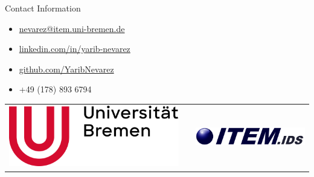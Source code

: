 \documentclass[final]{beamer}
\newlength{\onecolwid}
\begin{document}
\begin{frame}[t]
\begin{columns}[t]
\begin{column}{\onecolwid}
\begin{alertblock}{Contact Information}
\begin{itemize}
\item \href{mailto:nevarez@item.uni-bremen.de}{nevarez@item.uni-bremen.de}
\item \href{www.linkedin.com/in/yarib-nevarez}{linkedin.com/in/yarib-nevarez}
\item \href{https://github.com/YaribNevarez}{github.com/YaribNevarez}
\item +49 (178) 893 6794
\end{itemize}

\end{alertblock}

\begin{center}
\begin{tabular}{ccc}
\includegraphics[width=0.4\linewidth]{../figures/logo_ub_2021.png} & \hfill & \includegraphics[width=0.4\linewidth]{../figures/logo_item_ids.png}
\end{tabular}
\end{center}


\end{column} %

\end{columns} %

\end{frame} %
\end{document}
